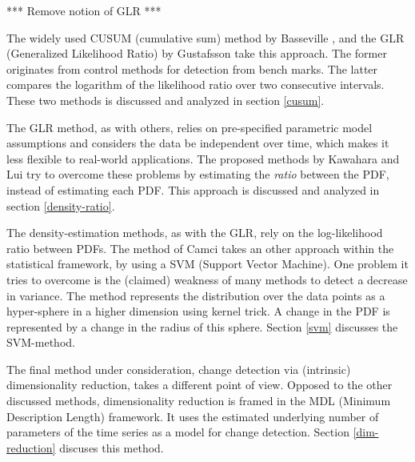 *** Remove notion of GLR ***


The widely used CUSUM (cumulative sum) method by Basseville \etal \cite{basseville1993detection}, and the GLR (Generalized Likelihood Ratio) by Gustafsson \cite{gustafsson1996marginalized,gustafsson2000adaptive} take this approach.
The former originates from control methods for detection from bench marks.
The latter compares the logarithm of the likelihood ratio over two consecutive intervals.
These two methods is discussed and analyzed in section \ref{cusum}.

The GLR method, as with others, relies on pre-specified parametric model assumptions and considers the data be independent over time, which makes it less flexible to real-world applications.
The proposed methods by Kawahara \etal \cite{kawahara2009change} and Lui \etal \cite{liu2013change} try to overcome these problems by estimating the \emph{ratio} between the PDF, instead of estimating each PDF.
This approach is discussed and analyzed in section \ref{density-ratio}.

The density-estimation methods, as with the GLR, rely on the log-likelihood ratio between PDFs.
The method of Camci \cite{camci2010change} takes an other approach within the statistical framework, by using a SVM (Support Vector Machine).
One problem it tries to overcome is the (claimed) weakness of many methods to detect a decrease in variance.
The method represents the distribution over the data points as a hyper-sphere in a higher dimension using kernel trick.
A change in the PDF is represented by a change in the radius of this sphere.
Section \ref{svm} discusses the SVM-method.

The final method under consideration, change detection via (intrinsic) dimensionality reduction, takes a different point of view.
Opposed to the other discussed methods, dimensionality reduction is framed in the MDL (Minimum Description Length) framework.
It uses the estimated underlying number of parameters of the time series as a model for change detection.
Section \ref{dim-reduction} discuses this method.










